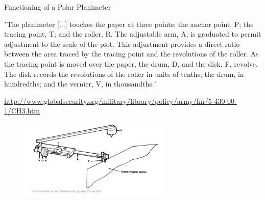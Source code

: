 \documentclass[smaller,hyperref={CJKbookmarks=true}]{beamer}
\begin{document}
\begin{frame}[t]{Functioning of a Polar Planimeter}
\begin{spacing}{0.9}
\begin{footnotesize}
"The planimeter [...] touches the paper at three points: the anchor point, P; the tracing
point, T; and the roller, R. The adjustable arm, A, is graduated to permit adjustment to
the scale of the plot. This adjustment provides a direct ratio between the area traced by
the tracing point and the revolutions of the roller. As the tracing point is moved over
the paper, the drum, D, and the disk, F, revolve. The disk records the revolutions of the
roller in units of tenths; the drum, in hundredths; and the vernier, V, in thousandths."
\end{footnotesize}
\begin{center}
  \begin{small}
    \url{http://www.globalsecurity.org/military/library/policy/army/fm/5-430-00-1/CH3.htm}
  \end{small}
\end{center}
\begin{figure}
  \centering
  \includegraphics[width=0.65\textwidth]{72.jpg}
\end{figure}
\end{spacing}
\end{frame}
\end{document}
